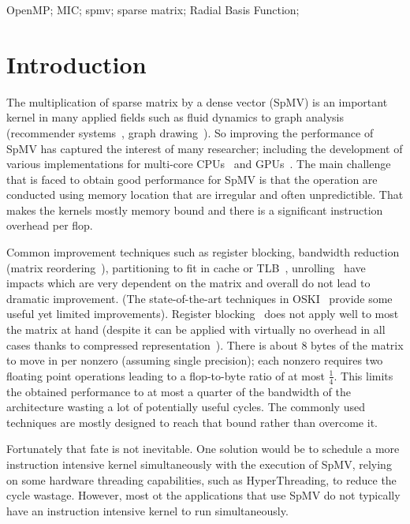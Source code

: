 \documentclass[10pt,conference,compsocconf]{IEEEtran}
\begin{document}
\begin{IEEEkeywords}
OpenMP; MIC; spmv; sparse matrix; Radial Basis Function;
\end{IEEEkeywords}

\IEEEpeerreviewmaketitle

\section{Introduction}
The multiplication of sparse matrix by a dense vector (SpMV) is an
important kernel in many applied fields such as fluid dynamics 
\cite{journals/tog/BolzFGS03} 
to graph analysis (recommender systems~\cite{Brin98}, graph
drawing~\cite{Koren05}). So improving the performance of SpMV has
captured the interest of many researcher; including the development of
various implementations for multi-core
CPUs~\cite{Buluc2009SPAA,Williams07} and GPUs~\cite{Bell08,
  conf/ipps/KreutzerHWFBB12,
  journals/concurrency/VazquezFG11,kumar2012accelerating}. The main
challenge that is faced to obtain good performance for SpMV is that
the operation are conducted using memory location that are irregular
and often unpredictible. That makes the kernels mostly memory
bound and there is a significant instruction overhead per flop.

Common improvement techniques such as register blocking, bandwidth
reduction (matrix reordering~\cite{Cuthill69}), partitioning to fit in
cache or TLB~\cite{Nishtala07,Temam:1992:CBS:147877.148091,conf/ppsc/Toledo97},
unrolling~\cite{Mellor-Crummey04} have impacts which are very
dependent on the matrix and overall do not lead to dramatic
improvement. (The state-of-the-art techniques in OSKI~\cite{Vuduc05}
provide some useful yet limited improvements). Register blocking~\cite{conf/ppsc/Toledo97} does
not apply well to most the matrix at hand (despite it can be applied
with virtually no overhead in all cases thanks to compressed
representation~\cite{Buluc11}). There is about 8 bytes of the matrix to move
in per nonzero (assuming single precision); each nonzero requires two
floating point operations leading to a flop-to-byte ratio of at most
$\frac{1}{4}$. This limits the obtained performance to at most a
quarter of the bandwidth of the architecture wasting a lot of
potentially useful cycles. The commonly used techniques are mostly
designed to reach that bound rather than overcome it.

Fortunately that fate is not inevitable. One solution would be to
schedule a more instruction intensive kernel simultaneously with the
execution of SpMV, relying on some hardware threading capabilities,
such as HyperThreading, to reduce the cycle wastage. However, most ot
the applications that use SpMV do not typically have an instruction
intensive kernel to run simultaneously.
\end{document}
